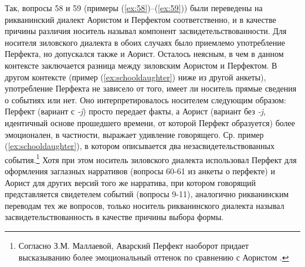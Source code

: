 \par Так, вопросы 58 и 59 (примеры (\ref{ex:58})--(\ref{ex:59})) были переведены на рикванинский диалект Аористом и Перфектом соответственно, и в качестве причины различия носитель называл компонент засвидетельствованности. Для носителя зиловского диалекта в обоих случаях было приемлемо употребление Перфекта, но допускался также и Аорист. Осталось неясным, в чем в данном контексте заключается разница между зиловским Аористом и Перфектом. В другом контексте (пример (\ref{ex:schooldaughter}) ниже из другой анкеты), употребление Перфекта не зависело от того, имеет ли носитель прямые сведения о событиях или нет. Оно интерпретировалось носителем следующим образом: Перфект (вариант с \textit{-j}) просто передает факты, а Аорист (вариант без \textit{-j}, идентичный основе прошедшего времени, от которой Перфект образуется) более эмоционален, в частности, выражает удивление говорящего. Ср. пример (\ref{ex:schooldaughter}), в котором описывается два незасвидетельствованных события.\footnote{Согласно З.М. Маллаевой, Аварский Перфект наоборот придает высказыванию более эмоциональный оттенок по сравнению с Аористом \citep[217--218]{mallaeva2007}.} Хотя при этом носитель зиловского диалекта использовал Перфект для оформления заглазных нарративов (вопросы 60-61 из анкеты о перфекте) и  Аорист для других версий того же нарратива, при котором говорящий представляется свидетелем событий (вопросы 9-11), аналогично рикванинским переводам тех же вопросов, только носитель рикванинского диалекта называл засвидетельствованность в качестве причины выбора формы.

\vfill
\pagebreak



